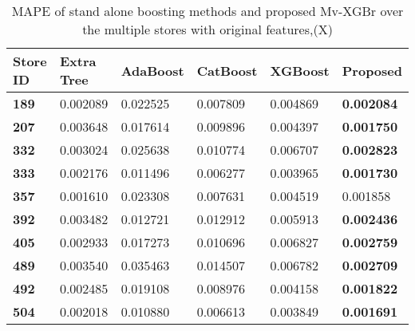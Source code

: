 \begin{table*}[]
\centering
\caption{MAPE of stand alone boosting methods and proposed Mv-XGBr over the multiple stores with original features,(X)}
\setlength{\tabcolsep}{3pt}
 {\renewcommand{\arraystretch}{1}%
\label{tab:my-table}
\begin{tabular}{llllll}
\hline \textbf{Store ID} & \textbf{Extra Tree} & \textbf{AdaBoost} & \textbf{CatBoost} & \textbf{XGBoost} & \textbf{Proposed}    \\ \hline
\textbf{189}   & 0.002089            & 0.022525                      & 0.007809                      & 0.004869                     & \textbf{0.002084} \\
\textbf{207}   & 0.003648            & 0.017614                      & 0.009896                      & 0.004397                     & \textbf{0.001750} \\
\textbf{332}   & 0.003024            & 0.025638                      & 0.010774                      & 0.006707                     & \textbf{0.002823} \\
\textbf{333}   & 0.002176            & 0.011496                      & 0.006277                      & 0.003965                     & \textbf{0.001730} \\
\textbf{357}   & 0.001610            & 0.023308                      & 0.007631                      & 0.004519                     & 0.001858          \\
\textbf{392}   & 0.003482            & 0.012721                      & 0.012912                      & 0.005913                     & \textbf{0.002436} \\
\textbf{405}   & 0.002933            & 0.017273                      & 0.010696                      & 0.006827                     & \textbf{0.002759} \\
\textbf{489}   & 0.003540            & 0.035463                      & 0.014507                      & 0.006782                     & \textbf{0.002709} \\
\textbf{492}   & 0.002485            & 0.019108                      & 0.008976                      & 0.004158                     & \textbf{0.001822} \\
\textbf{504}   & 0.002018            & 0.010880                      & 0.006613                      & 0.003849                     & \textbf{0.001691} \\ \hline
\end{tabular}%
}
\end{table*}

